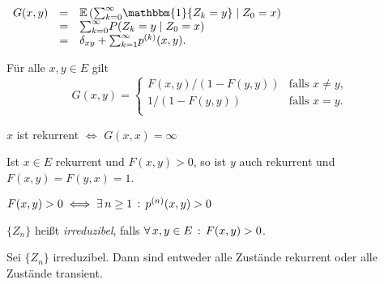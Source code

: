 \documentclass{cheat-sheet}
\newcommand{\E}{\mathbb{E}} %
\newcommand{\ind}{\mathbbm{1}} %
\begin{document}
\begin{bem}
  $
    \begin{array}[t]{r c l}
      G(x, y) &=& \E \left( {\sum}_{k=0}^\infty \ind \{ Z_k = y \} \mid Z_0 = x \right) \\
      &=& {\sum}_{k=0}^\infty P(Z_k = y \mid Z_0 = x) \\
      &=& \delta_{xy} + {\sum}_{k=1}^\infty p^{(k)}(x, y).
    \end{array}
  $
\end{bem}

\begin{satz}
  Für alle $x, y \in E$ gilt
  \[
    G(x, y) = 
    \begin{cases}
      F(x, y)/(1 - F(y, y)) & \text{falls $x \neq y$}, \\
      1/(1 - F(y, y)) & \text{falls $x = y$}. \\
    \end{cases}
  \]
\end{satz}

\begin{kor}
  $x$ ist rekurrent $\iff$ $G(x, x) = \infty$
\end{kor}

\begin{satz}
  Ist $x \in E$ rekurrent und $F(x, y) > 0$, so ist $y$ auch rekurrent und $F(x, y) = F(y, x) = 1$.
\end{satz}

\iffalse
\begin{interp}
  $F(x, y) > 0$ bedeutet, dass nach jedem Besuch in~$x$ der Zustand $y$ auch besucht wird mit positiver Wahrscheinlichkeit und die Rekurrenz von~$x$ bedeutet, dass $x$ unendlich oft besucht wird.
  Der Satz sagt, dass dann auch $y$ unendlich oft besucht wird.
\end{interp}
\fi

\begin{bem}
  $F(x, y) > 0 \iff \exists \, {n \geq 1} \,:\, p^{(n)}(x, y) > 0$
\end{bem}

\begin{defn}
  $\{ Z_n \}$ heißt \emph{irreduzibel}, falls $\forall \, {x, y \in E} \,:\, F(x, y) > 0$.
\end{defn}

\begin{satz}
  Sei $\{ Z_n \}$ irreduzibel.
  Dann sind entweder alle Zustände rekurrent oder alle Zustände transient.
\end{satz}
\end{document}

